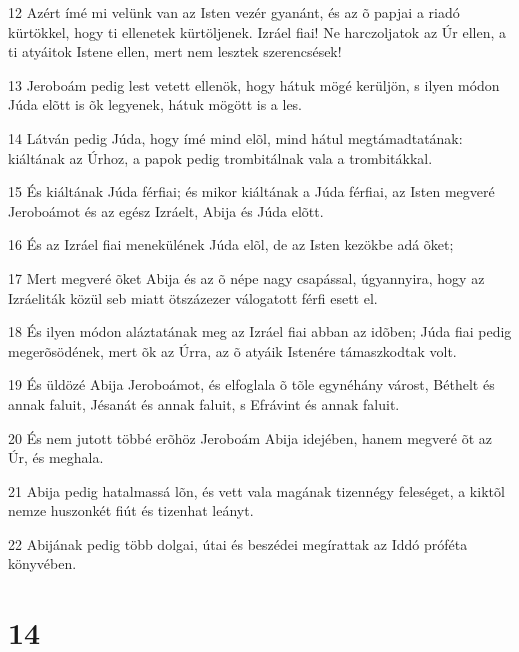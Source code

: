 \par 12 Azért ímé mi velünk van az Isten vezér gyanánt, és az õ papjai a riadó kürtökkel, hogy ti ellenetek kürtöljenek. Izráel fiai! Ne harczoljatok az Úr ellen, a ti atyáitok Istene ellen, mert nem lesztek szerencsések!
\par 13 Jeroboám pedig lest vetett ellenök, hogy hátuk mögé kerüljön, s ilyen módon Júda elõtt is õk legyenek, hátuk mögött is a les.
\par 14 Látván pedig Júda, hogy ímé mind elõl, mind hátul megtámadtatának: kiáltának az Úrhoz, a papok pedig trombitálnak vala a trombitákkal.
\par 15 És kiáltának Júda férfiai; és mikor kiáltának a Júda férfiai, az Isten megveré Jeroboámot és az egész Izráelt, Abija és Júda elõtt.
\par 16 És az Izráel fiai menekülének Júda elõl, de az Isten kezökbe adá õket;
\par 17 Mert megveré õket Abija és az õ népe nagy csapással, úgyannyira, hogy az Izráeliták közül seb miatt ötszázezer válogatott férfi esett el.
\par 18 És ilyen módon aláztatának meg az Izráel fiai abban az idõben; Júda fiai pedig megerõsödének, mert õk az Úrra, az õ atyáik Istenére támaszkodtak volt.
\par 19 És üldözé Abija Jeroboámot, és elfoglala õ tõle egynéhány várost, Béthelt és annak faluit, Jésanát és annak faluit, s Efrávint és annak faluit.
\par 20 És nem jutott többé erõhöz Jeroboám Abija idejében, hanem megveré õt az Úr, és meghala.
\par 21 Abija pedig hatalmassá lõn, és vett vala magának tizennégy feleséget, a kiktõl nemze huszonkét fiút és tizenhat leányt.
\par 22 Abijának pedig több dolgai, útai és beszédei megírattak az Iddó próféta könyvében.

\chapter{14}

